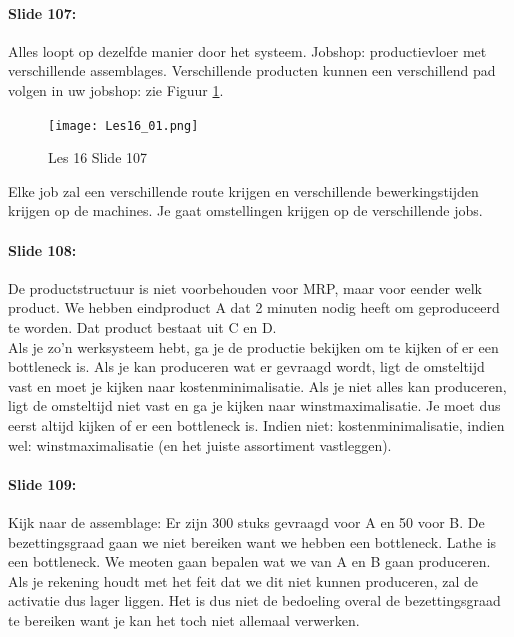 \documentclass[10pt,a4paper]{report}
\begin{document}
\paragraph{Slide 107:} Alles loopt op dezelfde manier door het systeem. Jobshop: productievloer met verschillende assemblages. Verschillende producten kunnen een verschillend pad volgen in uw jobshop: zie Figuur \ref{les16_01}.\\

\begin{figure}[h!]
\centering
\texttt{[image: Les16\_01.png]}
\caption{Les 16 Slide 107} 
\label{les16_01}
\end{figure}

Elke job zal een verschillende route krijgen en verschillende bewerkingstijden krijgen op de machines. Je gaat omstellingen krijgen op de verschillende jobs. 

\paragraph{Slide 108:} De productstructuur is niet voorbehouden voor MRP, maar voor eender welk product.%
We hebben eindproduct A dat 2 minuten nodig heeft om geproduceerd te worden. Dat product bestaat uit C en D. \\
Als je zo'n werksysteem hebt, ga je de productie bekijken om te kijken of er een bottleneck is. Als je kan produceren wat er gevraagd wordt, ligt de omsteltijd vast en moet je kijken naar kostenminimalisatie. Als je niet alles kan produceren, ligt de omsteltijd niet vast en ga je kijken naar winstmaximalisatie. Je moet dus eerst altijd kijken of er een bottleneck is. Indien niet: kostenminimalisatie, indien wel: winstmaximalisatie (en het juiste assortiment vastleggen).

\paragraph{Slide 109:} Kijk naar de assemblage: Er zijn 300 stuks gevraagd voor A en 50 voor B. De bezettingsgraad gaan we niet bereiken want we hebben een bottleneck. Lathe is een bottleneck. We meoten gaan bepalen wat we van A en B gaan produceren.\\
Als je rekening houdt met het feit dat we dit niet kunnen produceren, zal de activatie dus lager liggen. Het is dus niet de bedoeling overal de bezettingsgraad te bereiken want je kan het toch niet allemaal verwerken. 
\end{document}

